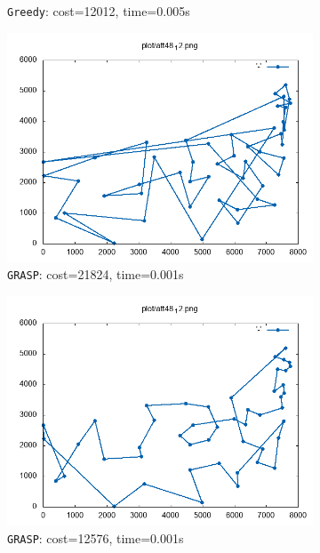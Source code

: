 \begin{figure}[!h]
\begin{subfigure}{.49\textwidth}
		\caption{\texttt{Greedy}: cost=12012, time=0.005s}
		\label{fig:att48_GREEDY}
	\end{subfigure}
	\begin{subfigure}{.49\textwidth}
	\centering
	\includegraphics[width=\columnwidth]{../res/att48_12_1.png}
	\caption{\texttt{GRASP}: cost=21824, time=0.001s}
	\label{fig:att48_GRASP1}
	\end{subfigure}
	\begin{subfigure}{.49\textwidth}
	\centering
	\includegraphics[width=\columnwidth]{../res/att48_12_2.png}
	\caption{\texttt{GRASP}: cost=12576, time=0.001s}
	\label{fig:att48_GRASP2}
	\end{subfigure}
	\begin{subfigure}{.49\textwidth}

\end{subfigure}
\end{figure}

